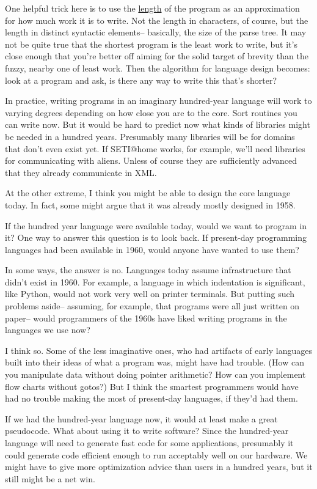 \documentclass[12pt]{book}
\begin{document}
One helpful trick here is to use the \href{power.html}{length} of the
program as an approximation for how much work it is to write. Not the
length in characters, of course, but the length in distinct syntactic
elements-- basically, the size of the parse tree. It may not be quite
true that the shortest program is the least work to write, but it's
close enough that you're better off aiming for the solid target of
brevity than the fuzzy, nearby one of least work. Then the algorithm for
language design becomes: look at a program and ask, is there any way to
write this that's shorter?

In practice, writing programs in an imaginary hundred-year language will
work to varying degrees depending on how close you are to the core. Sort
routines you can write now. But it would be hard to predict now what
kinds of libraries might be needed in a hundred years. Presumably many
libraries will be for domains that don't even exist yet. If SETI@home
works, for example, we'll need libraries for communicating with aliens.
Unless of course they are sufficiently advanced that they already
communicate in XML.

At the other extreme, I think you might be able to design the core
language today. In fact, some might argue that it was already mostly
designed in 1958.

If the hundred year language were available today, would we want to
program in it? One way to answer this question is to look back. If
present-day programming languages had been available in 1960, would
anyone have wanted to use them?

In some ways, the answer is no. Languages today assume infrastructure
that didn't exist in 1960. For example, a language in which indentation
is significant, like Python, would not work very well on printer
terminals. But putting such problems aside-- assuming, for example, that
programs were all just written on paper-- would programmers of the 1960s
have liked writing programs in the languages we use now?

I think so. Some of the less imaginative ones, who had artifacts of
early languages built into their ideas of what a program was, might have
had trouble. (How can you manipulate data without doing pointer
arithmetic? How can you implement flow charts without gotos?) But I
think the smartest programmers would have had no trouble making the most
of present-day languages, if they'd had them.

If we had the hundred-year language now, it would at least make a great
pseudocode. What about using it to write software? Since the
hundred-year language will need to generate fast code for some
applications, presumably it could generate code efficient enough to run
acceptably well on our hardware. We might have to give more optimization
advice than users in a hundred years, but it still might be a net win.
\end{document}
